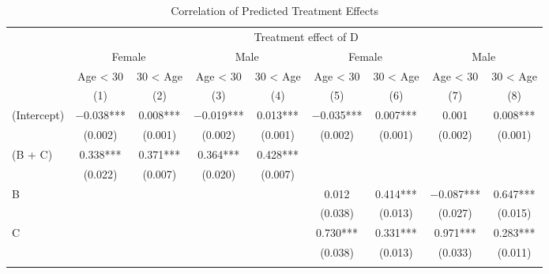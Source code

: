 \documentclass[
]{article}
\begin{document}
\begin{table}

\caption{\label{tab:rcf-int-corr}Correlation of Predicted Treatment Effects}
\centering
\fontsize{9}{11}\selectfont
\begin{threeparttable}
\begin{tabular}[t]{lcccccccc}
\toprule
\multicolumn{1}{c}{ } & \multicolumn{8}{c}{Treatment effect of D} \\
\cmidrule(l{3pt}r{3pt}){2-9}
\multicolumn{1}{c}{ } & \multicolumn{2}{c}{Female} & \multicolumn{2}{c}{Male} & \multicolumn{2}{c}{Female} & \multicolumn{2}{c}{Male} \\
\cmidrule(l{3pt}r{3pt}){2-3} \cmidrule(l{3pt}r{3pt}){4-5} \cmidrule(l{3pt}r{3pt}){6-7} \cmidrule(l{3pt}r{3pt}){8-9}
\multicolumn{1}{c}{ } & \multicolumn{1}{c}{Age < 30} & \multicolumn{1}{c}{30 < Age} & \multicolumn{1}{c}{Age < 30} & \multicolumn{1}{c}{30 < Age} & \multicolumn{1}{c}{Age < 30} & \multicolumn{1}{c}{30 < Age} & \multicolumn{1}{c}{Age < 30} & \multicolumn{1}{c}{30 < Age} \\
\cmidrule(l{3pt}r{3pt}){2-2} \cmidrule(l{3pt}r{3pt}){3-3} \cmidrule(l{3pt}r{3pt}){4-4} \cmidrule(l{3pt}r{3pt}){5-5} \cmidrule(l{3pt}r{3pt}){6-6} \cmidrule(l{3pt}r{3pt}){7-7} \cmidrule(l{3pt}r{3pt}){8-8} \cmidrule(l{3pt}r{3pt}){9-9}
  & (1) & (2) & (3) & (4) & (5) & (6) & (7) & (8)\\
\midrule
(Intercept) & \num{-0.038}*** & \num{0.008}*** & \num{-0.019}*** & \num{0.013}*** & \num{-0.035}*** & \num{0.007}*** & \num{0.001} & \num{0.008}***\\
 & (\num{0.002}) & (\num{0.001}) & (\num{0.002}) & (\num{0.001}) & (\num{0.002}) & (\num{0.001}) & (\num{0.002}) & (\num{0.001})\\
(B + C) & \num{0.338}*** & \num{0.371}*** & \num{0.364}*** & \num{0.428}*** &  &  &  & \\
 & (\num{0.022}) & (\num{0.007}) & (\num{0.020}) & (\num{0.007}) &  &  &  \vphantom{1} & \\
B &  &  &  &  & \num{0.012} & \num{0.414}*** & \num{-0.087}*** & \num{0.647}***\\
 &  &  &  &  & (\num{0.038}) & (\num{0.013}) & (\num{0.027}) & (\num{0.015})\\
C &  &  &  &  & \num{0.730}*** & \num{0.331}*** & \num{0.971}*** & \num{0.283}***\\
 &  &  &  &  & (\num{0.038}) & (\num{0.013}) & (\num{0.033}) & (\num{0.011})\\
\addlinespace[0.3em]
\multicolumn{9}{l}{\textit{Linear combination test (F-test)}}\\

\end{tabular}
\end{threeparttable}
\end{table}
\end{document}
